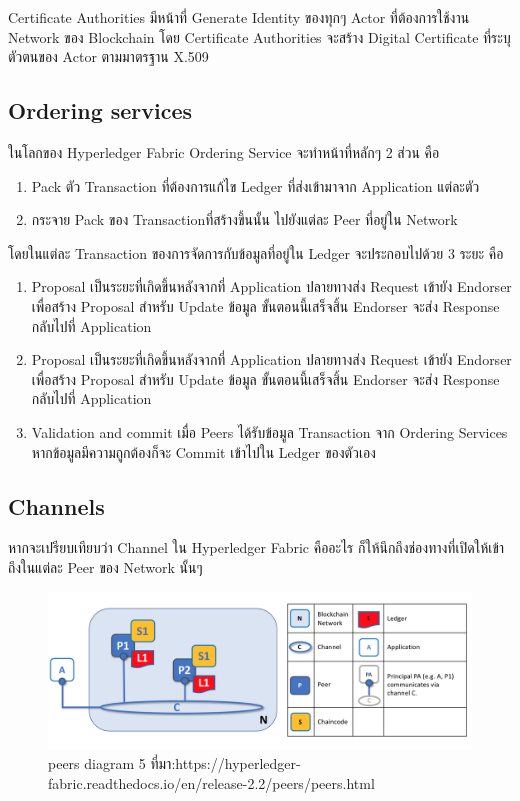 Certificate Authorities มีหน้าที่ Generate Identity ของทุกๆ Actor ที่ต้องการใช้งาน Network ของ Blockchain โดย Certificate Authorities จะสร้าง Digital Certificate ที่ระบุตัวตนของ Actor ตามมาตรฐาน X.509

\subsection{Ordering services}
\cite{Hyperledger_a} 
ในโลกของ Hyperledger Fabric Ordering Service จะทำหน้าที่หลักๆ 2 ส่วน คือ
\begin{enumerate}
  \item Pack ตัว Transaction ที่ต้องการแก้ไข Ledger ที่ส่งเข้ามาจาก Application แต่ละตัว 
  \item กระจาย Pack ของ Transactionที่สร้างขึ้นนั้น ไปยังแต่ละ Peer ที่อยู่ใน Network
\end{enumerate}

โดยในแต่ละ Transaction ของการจัดการกับข้อมูลที่อยู่ใน Ledger จะประกอบไปด้วย 3 ระยะ คือ

\begin{enumerate}
  \item Proposal
  เป็นระยะที่เกิดขึ้นหลังจากที่ Application ปลายทางส่ง Request เข้ายัง Endorser เพื่อสร้าง Proposal สำหรับ Update ข้อมูล ขั้นตอนนี้เสร็จสิ้น Endorser จะส่ง Response กลับไปที่ Application
  \item Proposal
  เป็นระยะที่เกิดขึ้นหลังจากที่ Application ปลายทางส่ง Request เข้ายัง Endorser เพื่อสร้าง Proposal สำหรับ Update ข้อมูล ขั้นตอนนี้เสร็จสิ้น Endorser จะส่ง Response กลับไปที่ Application
  \item Validation and commit
  เมื่อ Peers ได้รับข้อมูล Transaction จาก Ordering Services หากข้อมูลมีความถูกต้องก็จะ Commit เข้าไปใน Ledger ของตัวเอง
\end{enumerate}

\subsection{Channels}
\cite{Hyperledger_a} 
หากจะเปรียบเทียบว่า Channel ใน Hyperledger Fabric คืออะไร ก็ให้นึกถึงช่องทางที่เปิดให้เข้าถึงในแต่ละ Peer ของ Network นั้นๆ
\graphicspath{ {./images/} }
\begin{figure}[htbp]
  \centering 
  \includegraphics[scale=0.5]{peers diagram 5.png}
  \caption[Peers Diagram 5]{peers diagram 5
  ที่มา:https://hyperledger-fabric.readthedocs.io/en/release-2.2/peers/peers.html}
  \label{fig:peers diagram 5}
\end{figure}

